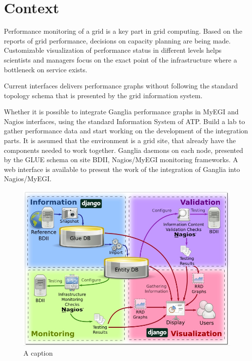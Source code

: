 \section{Context}

Performance monitoring of a grid is a key part in grid computing. Based on the
reports of grid performance, decisions on capacity planning are being made.
Customizable visualization of performance status in different levels helps
scientists and managers focus on the exact point of the infrastructure where a
bottleneck on service exists.
 
Current interfaces delivers performance graphs without following the standard
topology schema that is presented by the grid information system. 


Whether it is possible to integrate Ganglia performance graphs in MyEGI
and Nagios interfaces, using the standard Information System of ATP.
Build a lab to gather performance data and start working on the development of
the integration parts.
It is assumed that the environment is a grid site, that already have the
components needed to work together. Ganglia daemons on each node, presented by
the GLUE schema on site BDII, Nagios/MyEGI monitoring frameworks.
A web interface is available to present the work of the integration of Ganglia
into Nagios/MyEGI.

\begin{figure}[htb]
\centering
\includegraphics[width=150mm]{images/gstat-architecture.jpg}
\caption{A caption}
\label{figure:alabel}
\end{figure}


